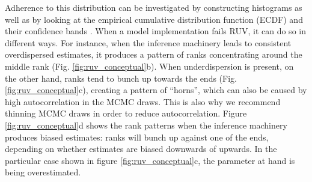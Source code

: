 \documentclass[oneside]{article}
\begin{document}

Adherence to this distribution can be investigated by constructing histograms \citep{Talts2018} as well as by looking at the empirical cumulative distribution function (ECDF) and their confidence bands \citep{Sailynoja2021}.
When a model implementation fails RUV, it can do so in different ways.
For instance, when the inference machinery leads to consistent overdispersed estimates, it produces a pattern of ranks concentrating around the middle rank (Fig. \ref{fig:ruv_conceptual}b).
When underdispersion is present, on the other hand, ranks tend to bunch up towards the ends (Fig. \ref{fig:ruv_conceptual}c), creating a pattern of ``horns'', which can also be caused by high autocorrelation in the MCMC draws.
This is also why we recommend thinning MCMC draws in order to reduce autocorrelation.
Figure \ref{fig:ruv_conceptual}d shows the rank patterns when the inference machinery produces biased estimates: ranks will bunch up against one of the ends, depending on whether estimates are biased downwards of upwards.
In the particular case shown in figure \ref{fig:ruv_conceptual}c, the parameter at hand is being overestimated.
\end{document}
